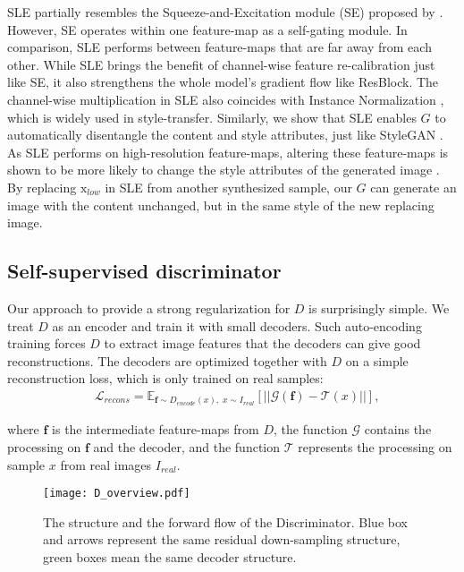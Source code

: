 \documentclass{article} \usepackage{iclr2021_conference,times}
\begin{document}
SLE partially resembles the Squeeze-and-Excitation module (SE) proposed by \citeauthor{hu2018squeeze}. However, SE operates within one feature-map as a self-gating module. In comparison, SLE performs between feature-maps that are far away from each other. While SLE brings the benefit of channel-wise feature re-calibration just like SE, it also strengthens the whole model's gradient flow like ResBlock. The channel-wise multiplication in SLE also coincides with Instance Normalization \citep{ulyanov2016instance,huang2017arbitrary}, which is widely used in style-transfer. Similarly, we show that SLE enables $G$ to automatically disentangle the content and style attributes, just like StyleGAN \citep{karras2019style}. As SLE performs on high-resolution feature-maps, altering these feature-maps is shown to be more likely to change the style attributes of the generated image \citep{karras2019style,liu2020time}. By replacing $\mathrm{x}_{low}$ in SLE from another synthesized sample, our $G$ can generate an image with the content unchanged, but in the same style of the new replacing image.


\subsection{Self-supervised discriminator}
Our approach to provide a strong regularization for $D$ is surprisingly simple. We treat $D$ as an encoder and train it with small decoders. Such auto-encoding training forces $D$ to extract image features that the decoders can give good reconstructions. The decoders are optimized together with $D$ on a simple reconstruction loss, which is only trained on real samples:
\begin{align}
    &\mathcal{L}_{recons}= \mathbb{E}_{ \mathbf{f} \sim D_{encode}(x), \; x \sim I_{real} } [ ||  \mathcal{G} ( \mathbf{f} ) - \mathcal{T}(x) || ],
    \label{eq:rec}
\end{align}

where $\mathbf{f}$ is the intermediate feature-maps from $D$, the function $\mathcal{G}$ contains the processing on $\mathbf{f}$ and the decoder, and the function $\mathcal{T}$ represents the processing on sample $x$ from real images $I_{real}$.

\begin{figure}[h]
\begin{center}
\texttt{[image: D\_overview.pdf]}
\end{center}
\caption{The structure and the forward flow of the Discriminator. Blue box and arrows represent the same residual down-sampling structure, green boxes mean the same decoder structure.}
\label{fig:d_overview}
\end{figure}
\end{document}
